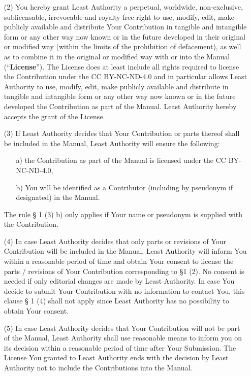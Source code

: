 \begin{itemize}
\item[(2)] You hereby grant Least Authority a perpetual, worldwide, non-exclusive, sublicensable, irrevocable and royalty-free right to use, modify, edit, make publicly available and distribute Your Contribution in tangible and intangible form or any other way now known or in the future developed in their original or modified way (within the limits of the prohibition of defacement), as well as to combine it in the original or modified way with or into the Manual (``\textbf{License}''). The License does at least include all rights required to license the Contribution under the CC BY-NC-ND-4.0 and in particular allows Least Authority to use, modify, edit, make publicly available and distribute in tangible and intangible form or any other way now known or in the future developed the Contribution as part of the Manual. Least Authority hereby accepts the grant of the License. 
\item[(3)] If Least Authority decides that Your Contribution or parts thereof shall be included in the Manual, Least Authority will ensure the following: 
	\begin{itemize}
	\item[a)] the Contribution as part of the Manual is licensed under the CC BY-NC-ND-4.0, 
	\item[b)]You will be identified as a Contributor (including by pseudonym if designated) in the Manual. 
	\end{itemize}
The rule § 1 (3) b) only applies if Your name or pseudonym is supplied with the Contribution. 
\item[(4)] In case Least Authority decides that only parts or revisions of Your Contribution will be included in the Manual, Least Authority will inform You within a reasonable period of time and obtain Your consent to license the parts / revisions of Your Contribution corresponding to §1 (2). No consent is needed if only editorial changes are made by Least Authority. In case You decide to submit Your Contribution with no information to contact You, this clause § 1 (4) shall not apply since Least Authority has no possibility to obtain Your consent.      
\item[(5)] In case Least Authority decides that Your Contribution will not be part of the Manual, Least Authority shall use reasonable means to inform you on its decision within a reasonable period of time after Your Submission. The License You granted to Least Authority ends with the decision by Least Authority not to include the Contributions into the Manual. 
\end{itemize}

